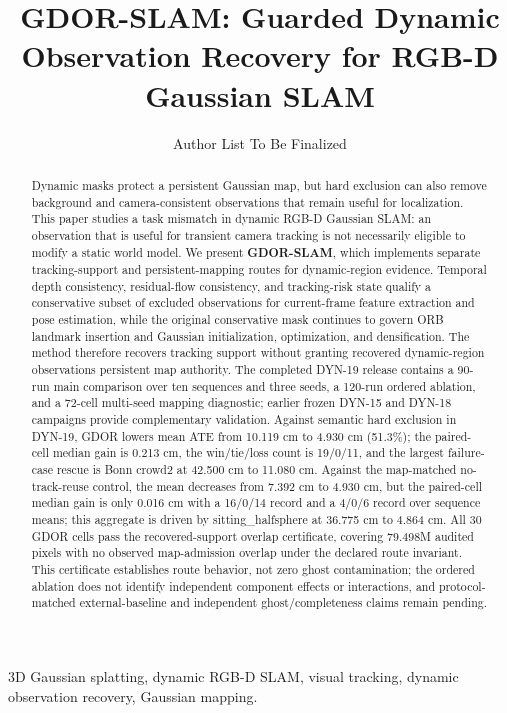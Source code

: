 \documentclass[journal]{IEEEtran}
\begin{document}
\title{GDOR-SLAM: Guarded Dynamic Observation Recovery for RGB-D Gaussian SLAM}

\author{Author List To Be Finalized}

\maketitle

\begin{abstract}
Dynamic masks protect a persistent Gaussian map, but hard exclusion can also remove background and camera-consistent observations that remain useful for localization.
This paper studies a task mismatch in dynamic RGB-D Gaussian SLAM: an observation that is useful for transient camera tracking is not necessarily eligible to modify a static world model.
We present \textbf{GDOR-SLAM}, which implements separate tracking-support and persistent-mapping routes for dynamic-region evidence.
Temporal depth consistency, residual-flow consistency, and tracking-risk state qualify a conservative subset of excluded observations for current-frame feature extraction and pose estimation, while the original conservative mask continues to govern ORB landmark insertion and Gaussian initialization, optimization, and densification.
The method therefore recovers tracking support without granting recovered dynamic-region observations persistent map authority.
The completed DYN-19 release contains a 90-run main comparison over ten sequences and three seeds, a 120-run ordered ablation, and a 72-cell multi-seed mapping diagnostic; earlier frozen DYN-15 and DYN-18 campaigns provide complementary validation.
Against semantic hard exclusion in DYN-19, GDOR lowers mean ATE from 10.119 cm to 4.930 cm (51.3\%); the paired-cell median gain is 0.213 cm, the win/tie/loss count is 19/0/11, and the largest failure-case rescue is Bonn crowd2 at 42.500 cm to 11.080 cm.
Against the map-matched no-track-reuse control, the mean decreases from 7.392 cm to 4.930 cm, but the paired-cell median gain is only 0.016 cm with a 16/0/14 record and a 4/0/6 record over sequence means; this aggregate is driven by sitting\_halfsphere at 36.775 cm to 4.864 cm.
All 30 GDOR cells pass the recovered-support overlap certificate, covering 79.498M audited pixels with no observed map-admission overlap under the declared route invariant.
This certificate establishes route behavior, not zero ghost contamination; the ordered ablation does not identify independent component effects or interactions, and protocol-matched external-baseline and independent ghost/completeness claims remain pending.
\end{abstract}

\begin{IEEEkeywords}
3D Gaussian splatting, dynamic RGB-D SLAM, visual tracking, dynamic observation recovery, Gaussian mapping.
\end{IEEEkeywords}










\end{document}
